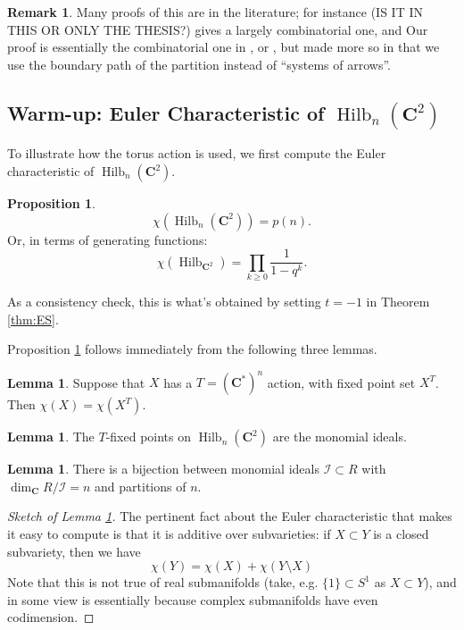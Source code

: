 \documentclass{amsart}[12pt]
\theoremstyle{definition}
\newtheorem{lemma}[dummy]{Lemma}
\newtheorem{remark}[dummy]{Remark}
\newtheorem{proposition}[dummy]{Proposition}
\newcommand{\C}{\mathbf{C}}
\newcommand{\II}{\mathcal{I}}
\DeclareMathOperator{\Hilb}{Hilb}
\begin{document}
\begin{remark}
Many proofs of this are in the literature; for instance \cite{cheah} (IS IT IN THIS OR ONLY THE THESIS?) gives a largely combinatorial one, and \cite{nakajimabook}   Our proof is essentially the combinatorial one in \cite{cheah}, or , but made more so in that we use the boundary path of the partition instead of ``systems of arrows''.  






\subsection{Warm-up: Euler Characteristic of $\Hilb_n(\C^2)$} \label{sec:Teuler}

To illustrate how the torus action is used, we first compute the Euler characteristic of $\Hilb_n(\C^2)$.




\begin{proposition} \label{prop:hilbchi}
$$\chi(\Hilb_n(\C^2))=p(n).$$
Or, in terms of generating functions:
$$\chi(\Hilb_{\C^2})=\prod_{k\geq 0} \frac{1}{1-q^k}.$$
\end{proposition}

As a consistency check, this is what's obtained by setting $t=-1$ in Theorem \ref{thm:ES}.


Proposition \ref{prop:hilbchi} follows immediately from the following three lemmas.

\begin{lemma} \label{lem:toruschi}
Suppose that $X$ has a $T=(\C^*)^n$ action, with fixed point set $X^T$.  Then $\chi(X)=\chi(X^T)$.
\end{lemma}

\begin{lemma} \label{lem:Tmonomials}
The $T$-fixed points on $\Hilb_n(\C^2)$ are the monomial ideals.
\end{lemma}

\begin{lemma} \label{lem:monomialspartitions}
There is a bijection between monomial ideals $\II\subset R$ with $\dim_\C R/\II=n$ and partitions of $n$.
\end{lemma}

\begin{proof}[Sketch of Lemma \ref{lem:toruschi}]

  The pertinent fact about the Euler characteristic that makes it easy to compute is that it is additive over subvarieties: if $X\subset Y$ is a closed subvariety, then we have
  \[\chi(Y)=\chi(X)+\chi(Y\setminus X)\]
Note that this is not true of real submanifolds (take, e.g. $\{1\}\subset S^1$ as $X\subset Y$), and in some view is essentially because complex submanifolds have even codimension.



\end{proof}
\end{remark}
\end{document}
